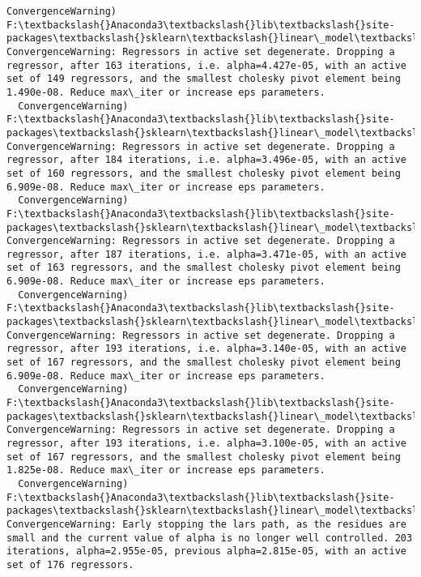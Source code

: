 \documentclass[11pt]{article}
\begin{document}
\begin{Verbatim}[commandchars=\\\{\}]
  ConvergenceWarning)
F:\textbackslash{}Anaconda3\textbackslash{}lib\textbackslash{}site-packages\textbackslash{}sklearn\textbackslash{}linear\_model\textbackslash{}least\_angle.py:313: ConvergenceWarning: Regressors in active set degenerate. Dropping a regressor, after 163 iterations, i.e. alpha=4.427e-05, with an active set of 149 regressors, and the smallest cholesky pivot element being 1.490e-08. Reduce max\_iter or increase eps parameters.
  ConvergenceWarning)
F:\textbackslash{}Anaconda3\textbackslash{}lib\textbackslash{}site-packages\textbackslash{}sklearn\textbackslash{}linear\_model\textbackslash{}least\_angle.py:313: ConvergenceWarning: Regressors in active set degenerate. Dropping a regressor, after 184 iterations, i.e. alpha=3.496e-05, with an active set of 160 regressors, and the smallest cholesky pivot element being 6.909e-08. Reduce max\_iter or increase eps parameters.
  ConvergenceWarning)
F:\textbackslash{}Anaconda3\textbackslash{}lib\textbackslash{}site-packages\textbackslash{}sklearn\textbackslash{}linear\_model\textbackslash{}least\_angle.py:313: ConvergenceWarning: Regressors in active set degenerate. Dropping a regressor, after 187 iterations, i.e. alpha=3.471e-05, with an active set of 163 regressors, and the smallest cholesky pivot element being 6.909e-08. Reduce max\_iter or increase eps parameters.
  ConvergenceWarning)
F:\textbackslash{}Anaconda3\textbackslash{}lib\textbackslash{}site-packages\textbackslash{}sklearn\textbackslash{}linear\_model\textbackslash{}least\_angle.py:313: ConvergenceWarning: Regressors in active set degenerate. Dropping a regressor, after 193 iterations, i.e. alpha=3.140e-05, with an active set of 167 regressors, and the smallest cholesky pivot element being 6.909e-08. Reduce max\_iter or increase eps parameters.
  ConvergenceWarning)
F:\textbackslash{}Anaconda3\textbackslash{}lib\textbackslash{}site-packages\textbackslash{}sklearn\textbackslash{}linear\_model\textbackslash{}least\_angle.py:313: ConvergenceWarning: Regressors in active set degenerate. Dropping a regressor, after 193 iterations, i.e. alpha=3.100e-05, with an active set of 167 regressors, and the smallest cholesky pivot element being 1.825e-08. Reduce max\_iter or increase eps parameters.
  ConvergenceWarning)
F:\textbackslash{}Anaconda3\textbackslash{}lib\textbackslash{}site-packages\textbackslash{}sklearn\textbackslash{}linear\_model\textbackslash{}least\_angle.py:339: ConvergenceWarning: Early stopping the lars path, as the residues are small and the current value of alpha is no longer well controlled. 203 iterations, alpha=2.955e-05, previous alpha=2.815e-05, with an active set of 176 regressors.

\end{Verbatim}
\end{document}
